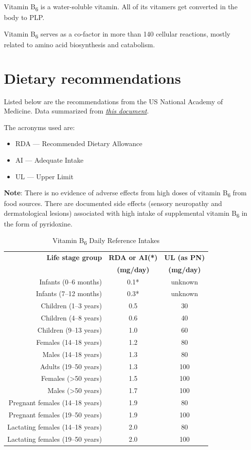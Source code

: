 \documentclass{book}
\begin{document}
\begin{sloppypar}
Vitamin B\textsubscript{6} is a water-soluble vitamin. All of its vitamers get converted in the body to PLP.

Vitamin B\textsubscript{6} serves as a co-factor in more than 140 cellular reactions, mostly related to amino acid biosynthesis and catabolism.

\section{Dietary recommendations}
Listed below are the recommendations from the US National Academy of Medicine. Data summarized from \href{https://nap.nationalacademies.org/read/6015/chapter/9}{\textit{this document}}.

The acronyms used are:
\begin{itemize}
	\item RDA --- Recommended Dietary Allowance
	\item AI --- Adequate Intake
	\item UL --- Upper Limit
\end{itemize}

\textbf{Note}: There is no evidence of adverse effects from high doses of vitamin B\textsubscript{6} from food sources. There are documented side effects (sensory neuropathy and dermatological lesions) associated with high intake of supplemental vitamin B\textsubscript{6} in the form of pyridoxine.

\begin{table}[ht]
	\caption{Vitamin B\textsubscript{6} Daily Reference Intakes}
	\centering \begin{tabular}{| r | c | c |}
		\hline
		\textbf{Life stage group} & \textbf{RDA or AI(*)} & \textbf{UL (as PN)}\\
		& \textbf{(mg/day)} & \textbf{(mg/day)}\\ \hline
		Infants (0--6 months) & 0.1* & unknown\\ \hline
		Infants (7--12 months) & 0.3* & unknown\\ \hline
		Children (1--3 years) & 0.5 & 30\\ \hline
		Children (4--8 years) & 0.6 & 40\\ \hline
		Children (9--13 years) & 1.0 & 60\\ \hline
		Females (14--18 years) & 1.2 & 80\\ \hline
		Males (14--18 years) & 1.3 & 80\\ \hline
		Adults (19--50 years) & 1.3 & 100\\ \hline
		Females (\textgreater50 years) & 1.5 & 100\\ \hline
		Males (\textgreater50 years) & 1.7 & 100\\ \hline
		Pregnant females (14--18 years) & 1.9 & 80\\ \hline
		Pregnant females (19--50 years) & 1.9 & 100\\ \hline
		Lactating females (14--18 years) & 2.0 & 80\\ \hline
		Lactating females (19--50 years) & 2.0 & 100\\ \hline
	\end{tabular}
\end{table}
\newpage


\end{sloppypar}
\end{document}
